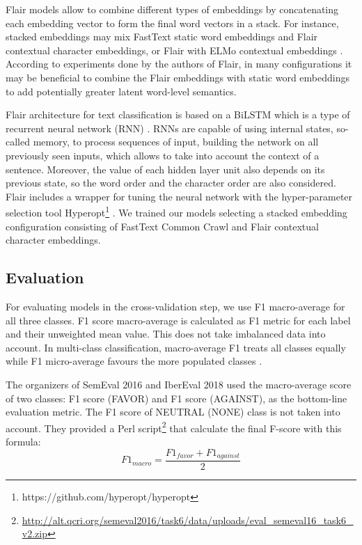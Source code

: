 \documentclass[10pt, a4paper]{article}
\begin{document}
Flair models allow to combine different types of embeddings by concatenating each embedding vector to form the final word vectors in a stack. For instance, stacked embeddings may mix FastText static word embeddings and Flair contextual character embeddings, or Flair with ELMo contextual embeddings \cite{Peters2018}. According to experiments done by the authors of Flair, in many configurations it may be beneficial to combine the Flair embeddings with static word embeddings to add potentially greater latent word-level semantics.

Flair architecture for text classification is based on a BiLSTM which is a type of recurrent neural network (RNN) \cite{Schuster97}. RNNs are capable of using internal states, so-called memory, to process sequences of input, building the network on all previously seen inputs, which allows to take into account the context of a sentence. Moreover, the value of each hidden layer unit also depends on its previous state, so the word order and the character order are also considered. Flair includes a wrapper for tuning the neural network with the hyper-parameter selection tool Hyperopt\footnote{https://github.com/hyperopt/hyperopt} \cite{Bergstra:2013:MSM:3042817.3042832}. We trained our models selecting a stacked embedding configuration consisting of FastText Common Crawl and Flair contextual character embeddings.

\subsection{Evaluation}\label{sec:evaluation}

For evaluating models in the cross-validation step, we use F1 macro-average for all three classes. F1 score macro-average is calculated as F1 metric for each label and their unweighted mean value. This does not take imbalanced data into account. In multi-class classification, macro-average F1 treats all classes equally while F1 micro-average favours the more populated classes \cite{Sokolova:2009}.

The organizers of SemEval 2016 and IberEval 2018 used the macro-average score of two classes: F1 score (FAVOR) and F1 score (AGAINST), as the bottom-line evaluation metric. The F1 score of NEUTRAL (NONE) class is not taken into account. They provided a Perl script\footnote{\url{http://alt.qcri.org/semeval2016/task6/data/uploads/eval_semeval16_task6_v2.zip}} that calculate the final F-score with this formula:
\[F1_{macro} = \frac{F1_{favor} + F1_{against}}{2}\]
\end{document}
